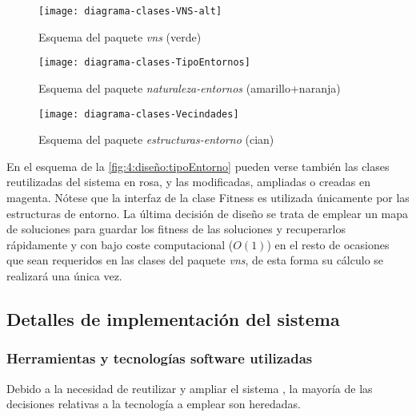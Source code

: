 \begin{figure}[htbp]
	\centering
	\texttt{[image: diagrama-clases-VNS-alt]}
	\caption{Esquema del paquete \textit{vns} (verde)}
	\label{fig:4:diseño:vns}
\end{figure}

\begin{figure}[htbp]
	\centering
	\texttt{[image: diagrama-clases-TipoEntornos]}
	\caption{Esquema del paquete \textit{naturaleza-entornos} (amarillo+naranja)}
	\label{fig:4:diseño:tipoEntorno}
\end{figure}

\begin{figure}[htbp]
	\centering
	\texttt{[image: diagrama-clases-Vecindades]}
	\caption{Esquema del paquete \textit{estructuras-entorno} (cian)}
	\label{fig:4:diseño:entornos}
\end{figure}

En el esquema de la \autoref{fig:4:diseño:tipoEntorno} pueden verse también las clases reutilizadas del sistema \legacy{} en rosa, y las modificadas, ampliadas o creadas en magenta. Nótese que la interfaz de la clase Fitness es utilizada únicamente por las estructuras de entorno. La última decisión de diseño se trata de emplear un mapa de soluciones para guardar los fitness de las soluciones y recuperarlos rápidamente y con bajo coste computacional ($O(1)$) en el resto de ocasiones que sean requeridos en las clases del paquete \textit{vns}, de esta forma su cálculo se realizará una única vez.





\subsection{Detalles de implementación del sistema}
\label{sec:4:implementacion}

\subsubsection{Herramientas y tecnologías software utilizadas}

Debido a la necesidad de reutilizar y ampliar el sistema \legacy{}, la mayoría de las decisiones relativas a la tecnología a emplear son heredadas. 


